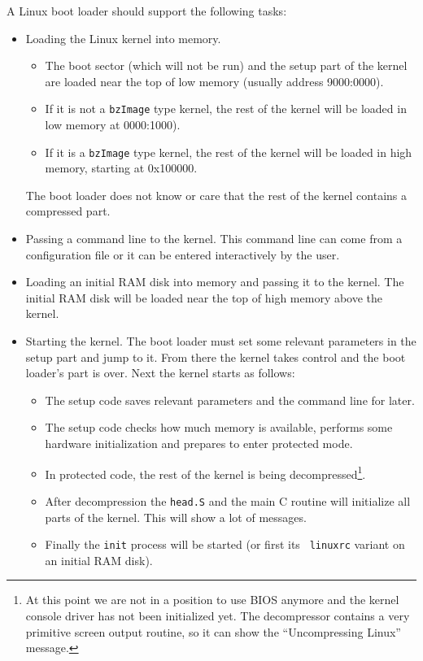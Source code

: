 \documentclass[12pt,a4paper]{article}
\begin{document}
A Linux boot loader should support the following tasks:
\begin{itemize}
\item Loading the Linux kernel into memory. 
  \begin{itemize}
  \item The boot sector (which will not be run) and the setup part of
  the kernel are loaded near the top of low memory (usually address 
  9000:0000).
  \item If it is not a {\tt bzImage} type kernel, the rest of the
  kernel will be loaded in low memory at 0000:1000).
  \item If it is a {\tt bzImage} type kernel, the rest of the kernel
  will be loaded in high memory, starting at 0x100000. 
  \end{itemize}
  The boot loader does not know or care that the rest of the kernel
  contains a compressed part.
\item Passing a command line to the kernel. This command line can come
  from a configuration file or it can be entered interactively by the
  user. 
\item Loading an initial RAM disk into memory and passing it to the kernel.
  The initial RAM disk will be loaded near the top of high memory
  above the kernel.
\item Starting the kernel. The boot loader must set some relevant
  parameters in the setup part and jump to it. From there the kernel
  takes control and the boot loader's part is over. Next the kernel
  starts as follows:
  \begin{itemize}
  \item The setup code saves relevant parameters and the command line
  for later.
  \item The setup code checks how much memory is available, performs
  some hardware initialization and prepares to enter protected mode.
  \item In protected code, the rest of the kernel is being
  decompressed\footnote{At this point we are not in a position to use
  BIOS anymore and the kernel console driver has not been initialized
  yet. The decompressor contains a very primitive screen output
  routine, so it can show the ``Uncompressing Linux'' message.}.
  \item After decompression the {\tt head.S} and the main C routine
  will initialize all parts of the kernel. This will show a lot of
  messages.
  \item Finally the {\tt init} process will be started (or first its {\tt
  linuxrc} variant on an initial RAM disk). 
  \end{itemize}
\end{itemize}
\end{document}
